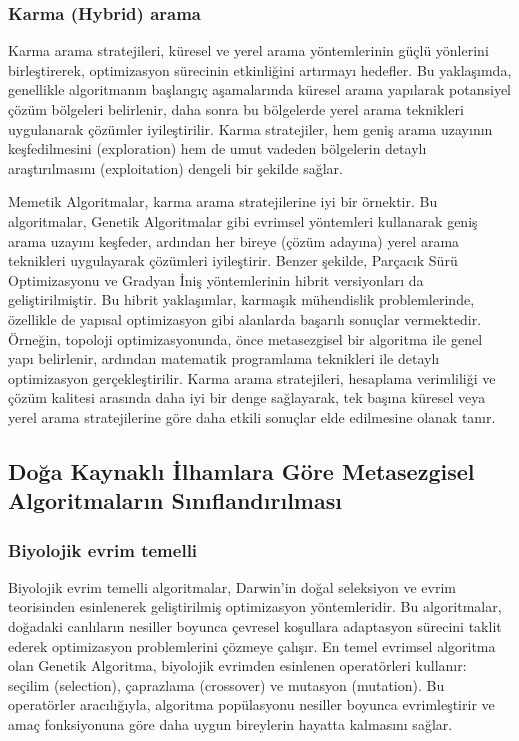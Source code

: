 \subsubsection{Karma (Hybrid) arama}

Karma arama stratejileri, küresel ve yerel arama yöntemlerinin güçlü yönlerini birleştirerek, optimizasyon sürecinin etkinliğini artırmayı hedefler. Bu yaklaşımda, genellikle algoritmanın başlangıç aşamalarında küresel arama yapılarak potansiyel çözüm bölgeleri belirlenir, daha sonra bu bölgelerde yerel arama teknikleri uygulanarak çözümler iyileştirilir. Karma stratejiler, hem geniş arama uzayının keşfedilmesini (exploration) hem de umut vadeden bölgelerin detaylı araştırılmasını (exploitation) dengeli bir şekilde sağlar.

Memetik Algoritmalar, karma arama stratejilerine iyi bir örnektir. Bu algoritmalar, Genetik Algoritmalar gibi evrimsel yöntemleri kullanarak geniş arama uzayını keşfeder, ardından her bireye (çözüm adayına) yerel arama teknikleri uygulayarak çözümleri iyileştirir. Benzer şekilde, Parçacık Sürü Optimizasyonu ve Gradyan İniş yöntemlerinin hibrit versiyonları da geliştirilmiştir. Bu hibrit yaklaşımlar, karmaşık mühendislik problemlerinde, özellikle de yapısal optimizasyon gibi alanlarda başarılı sonuçlar vermektedir. Örneğin, topoloji optimizasyonunda, önce metasezgisel bir algoritma ile genel yapı belirlenir, ardından matematik programlama teknikleri ile detaylı optimizasyon gerçekleştirilir. Karma arama stratejileri, hesaplama verimliliği ve çözüm kalitesi arasında daha iyi bir denge sağlayarak, tek başına küresel veya yerel arama stratejilerine göre daha etkili sonuçlar elde edilmesine olanak tanır.

\subsection{Doğa Kaynaklı İlhamlara Göre Metasezgisel Algoritmaların Sınıflandırılması}

\subsubsection{Biyolojik evrim temelli}

Biyolojik evrim temelli algoritmalar, Darwin'in doğal seleksiyon ve evrim teorisinden esinlenerek geliştirilmiş optimizasyon yöntemleridir. Bu algoritmalar, doğadaki canlıların nesiller boyunca çevresel koşullara adaptasyon sürecini taklit ederek optimizasyon problemlerini çözmeye çalışır. En temel evrimsel algoritma olan Genetik Algoritma, biyolojik evrimden esinlenen operatörleri kullanır: seçilim (selection), çaprazlama (crossover) ve mutasyon (mutation). Bu operatörler aracılığıyla, algoritma popülasyonu nesiller boyunca evrimleştirir ve amaç fonksiyonuna göre daha uygun bireylerin hayatta kalmasını sağlar.

